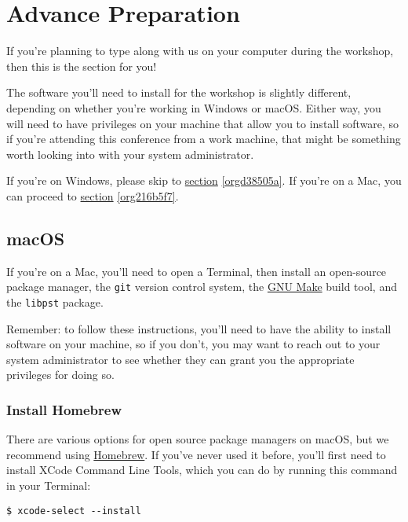 \documentclass[11pt]{article}
\begin{document}
\section{Advance Preparation \label{org86feb11}}
\label{sec:orgcdaa0dc}

If you're planning to type along with us on your computer during the
workshop, then this is the section for you!

The software you'll need to install for the workshop is slightly
different, depending on whether you're working in Windows or macOS.
Either way, you will need to have privileges on your machine that
allow you to install software, so if you're attending this conference
from a work machine, that might be something worth looking into with
your system administrator.

If you're on Windows, please skip to \hyperref[orgd38505a]{section} \ref{orgd38505a}.  If you're on a
Mac, you can proceed to \hyperref[org216b5f7]{section} \ref{org216b5f7}.

\subsection{macOS \label{org216b5f7}}
\label{sec:org3eb9ddb}

If you're on a Mac, you'll need to open a Terminal, then install an
open-source package manager, the \texttt{git} version control system, the
\href{https://www.gnu.org/software/make/}{GNU Make} build tool, and the
\texttt{libpst} package.

Remember: to follow these instructions, you'll need to have the
ability to install software on your machine, so if you don't, you may
want to reach out to your system administrator to see whether they can
grant you the appropriate privileges for doing so.

\subsubsection{Install Homebrew}
\label{sec:orga2b9e98}

There are various options for open source package managers on macOS,
but we recommend using \href{https://brew.sh}{Homebrew}.  If you've never used it
before, you'll first need to install XCode Command Line Tools, which
you can do by running this command in your Terminal:

\begin{verbatim}
$ xcode-select --install
\end{verbatim}
\end{document}
